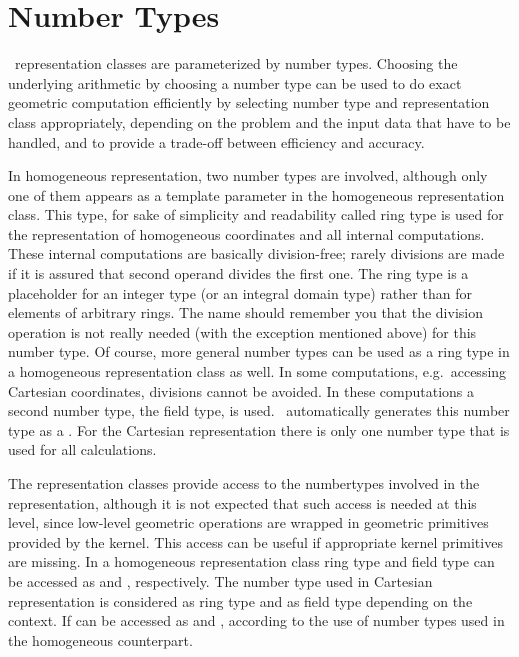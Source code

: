 
\chapter{Number Types}\label{Numbertype}

\cgal\ representation classes are parameterized by number types.  
Choosing the underlying arithmetic by choosing a number type
can be used to do exact geometric computation efficiently by
selecting number type and representation class appropriately,
depending on the problem and the input data that have to be handled,
and to provide a trade-off between efficiency and accuracy.  

In homogeneous representation, two number types are involved,
although only one of them appears as a template parameter in
the homogeneous representation class.
This type, for sake of simplicity and readability called ring type is
used for the representation of homogeneous coordinates and all 
internal computations. These internal computations are basically
division-free; rarely divisions are made if it is assured that second
operand divides the first one.
The ring type is a placeholder for an integer type (or an integral 
domain type) rather than for elements of arbitrary rings. 
The name should remember you that the division operation is not
really needed (with the exception mentioned above) for this number type.
Of course, more general number types can be used as a ring type 
in a homogeneous representation class as well.
In some computations, e.g.\ accessing Cartesian coordinates, divisions
cannot be avoided. In these computations a second number type, the
field type, is used. \cgal\ automatically generates this number
type as a .
For the Cartesian representation there is only one number type that is
used for all calculations.

The representation classes provide access to the numbertypes 
involved in the representation, although it is not expected that
such access is needed at this level, since low-level geometric 
operations are wrapped in geometric primitives provided by the kernel.
This access can be useful if appropriate kernel primitives are 
missing.
In a homogeneous representation class  ring type and field
type can be accessed as  and , respectively.
The number type used in Cartesian representation is considered as 
ring type and as field type depending on the context.
If can be accessed as  and , according
to the use of number types used in the homogeneous counterpart.

